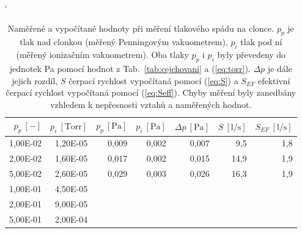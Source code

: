 \documentclass[english]{article}
\newcommand{\unitb}[1]{~\mathrm{[#1]}}
\begin{document}
\begin{table}[htbp]
\catcode` %
  \centering
      
          \begin{tabular}{|r|r|r|r|r|r|r|}
          \hline
          \boldmath{}\textbf{$p_p\unitb{-}$}\unboldmath{} & \boldmath{}\textbf{$p_i\unitb{Torr}$}\unboldmath{} & \boldmath{}\textbf{$p_p\unitb{Pa}$}\unboldmath{} & \boldmath{}\textbf{$p_i\unitb{Pa}$}\unboldmath{} & \boldmath{}\textbf{$\Delta p\unitb{Pa}$}\unboldmath{} & \boldmath{}\textbf{$S\unitb{l/s}$}\unboldmath{} & \boldmath{}\textbf{$S_{EF}\unitb{l/s}$}\unboldmath{} \bigstrut\\
          \hline
          1,00E-02 & 1,20E-05 & 0,009 & 0,002 & 0,007 & 9,5   & 1,8 \bigstrut\\
          \hline
          2,00E-02 & 1,60E-05 & 0,017 & 0,002 & 0,015 & 14,9  & 1,9 \bigstrut\\
          \hline
          5,00E-02 & 2,60E-05 & 0,029 & 0,003 & 0,026 & 16,3  & 1,9 \bigstrut\\
          \hline
          1,00E-01 & 4,50E-05 & \multicolumn{1}{r}{} & \multicolumn{1}{r}{} & \multicolumn{1}{r}{} & \multicolumn{1}{r}{} & \multicolumn{1}{r}{} \bigstrut\\
      \cline{1-2}    2,00E-01 & 9,00E-05 & \multicolumn{1}{r}{} & \multicolumn{1}{r}{} & \multicolumn{1}{r}{} & \multicolumn{1}{r}{} & \multicolumn{1}{r}{} \bigstrut\\
      \cline{1-2}    5,00E-01 & 2,00E-04 & \multicolumn{1}{r}{} & \multicolumn{1}{r}{} & \multicolumn{1}{r}{} & \multicolumn{1}{r}{} & \multicolumn{1}{r}{} \bigstrut\\
      \cline{1-2}    \end{tabular}%
  
    \caption{Naměřené a vypočítané hodnoty při měření tlakového spádu na clonce. $p_p$ je tlak nad clonkou (měřený Penningovým vakuometrem), $p_i$ tlak pod ní (měřený ionizačním vakuometrem). Oba tlaky $p_p$ i $p_i$ byly převedeny do jednotek Pa pomocí hodnot z Tab.~\ref{tab:cejchovani} a (\ref{eq:torr}). $\Delta p$ je dále jejich rozdíl, $S$ čerpací rychlost vypočítaná pomocí (\ref{eq:S}) a $S_{EF}$ efektivní čerpací rychlost vypočítaná pomocí (\ref{eq:Seff}). Chyby měření byly zanedbány vzhledem k nepřesnosti vztahů a naměřených hodnot.}
    \label{tab:clonka}%
\end{table}%
\end{document}
